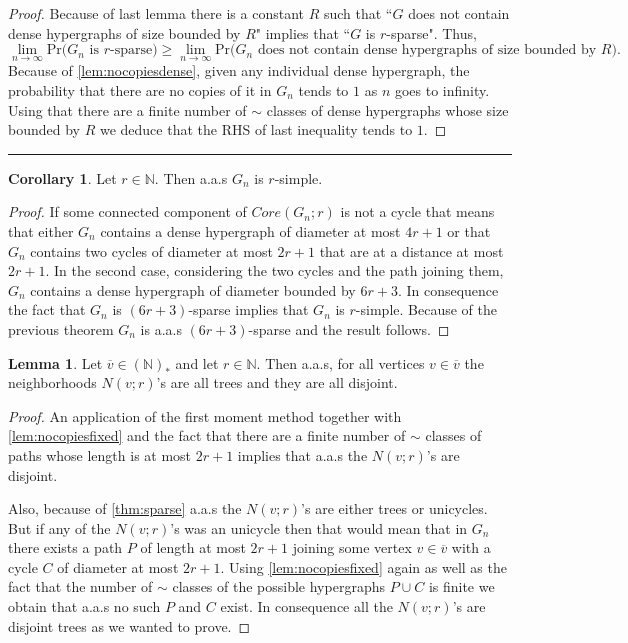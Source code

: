 \documentclass[12pt,notitlepage,a4paper]{article}
\theoremstyle{definition}
\newtheorem{lemma}{Lemma}[section]
\newtheorem{corollary}{Corollary}[section]
\newcommand{\N}{\mathbb{N}}
\newcommand{\Ln}{\lim\limits_{n\to \infty}}
\newcommand{\sep}{\noindent\rule{2cm}{0.4pt}}
\begin{document}
\begin{proof}
	Because of last lemma there is a constant $R$ such that 
	``$G$ does not contain dense hypergraphs of size bounded by $R$" implies
	that ``$G$ is $r$-sparse". Thus,
	\[ \Ln \mathrm{Pr}\big( G_n \text{ is } r \text{-sparse}  \big)
	\geq \Ln \mathrm{Pr} \big( G_n \text{ does not contain dense 
	hypergraphs of size bounded by } R\big).\] 
	Because of	\cref{lem:nocopiesdense}, given any individual dense hypergraph,
	the probability that there are no copies
	of it in $G_n$ tends to $1$ as $n$ goes to infinity. Using that
	there are a finite number of $\sim$ classes of dense hypergraphs whose
	size bounded by	$R$ we deduce that the RHS of last inequality tends to $1$. 
\end{proof}
\sep
\begin{corollary}\label{cor:simple}
	Let $r\in \N$. Then a.a.s $G_n$ is $r$-simple.
\end{corollary}
\begin{proof}
	If some connected component of $Core(G_n;r)$ is not a cycle that means
	that either $G_n$ contains a dense hypergraph of diameter at most $4r+1$
	or that $G_n$ contains two cycles of diameter at most $2r+1$ that are at
	a distance at most $2r+1$. In the second case, considering the two cycles
	and the path joining them, $G_n$ contains a dense hypergraph of diameter
	bounded by $6r+3$. In consequence the fact that $G_n$ is $(6r+3)$-sparse
	implies that $G_n$ is $r$-simple. Because of the previous theorem 
	$G_n$ is a.a.s $(6r+3)$-sparse and the result follows. 
\end{proof}
	
\begin{lemma} \label{lem:disjointtrees}
	Let $\overline{v}\in (\N)_*$ and let $r\in \N$. Then
	a.a.s, for all vertices $v\in \overline{v}$ the neighborhoods 
	$N(v;r)$'s are all trees and they are all disjoint. 
\end{lemma}
\begin{proof}
	An application of the first moment method together with
	\cref{lem:nocopiesfixed} and the fact that there are a finite number
	of $\sim$ classes of paths whose length is at most $2r+1$ implies that
	a.a.s the $N(v;r)$'s are disjoint. \par
	Also, because of \cref{thm:sparse} a.a.s the $N(v;r)$'s are either 
	trees or unicycles. But if any of the $N(v;r)$'s was an unicycle then
	that would mean that in $G_n$ there exists a path $P$ of length at most
	$2r+1$ joining some vertex $v\in \overline{v}$
	with a cycle $C$ of diameter at most $2r+1$. Using \cref{lem:nocopiesfixed}
	again as well as the fact that the number of $\sim$ classes of the possible hypergraphs
	$P\cup C$ is finite we obtain that a.a.s no such $P$ and $C$ exist. 
	In consequence all the $N(v;r)$'s are disjoint trees as we wanted to prove. \par
\end{proof}
\end{document}
